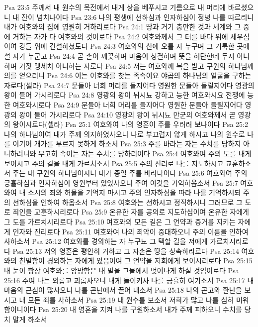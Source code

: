 Psa 23:5  주께서 내 원수의 목전에서 내게 상을 베푸시고 기름으로 내 머리에 바르셨으니 내 잔이 넘치나이다
Psa 23:6  나의 평생에 선하심과 인자하심이 정녕 나를 따르리니 내가 여호와의 집에 영원히 거하리로다
Psa 24:1  땅과 거기 충만한 것과 세계와 그 중에 거하는 자가 다 여호와의 것이로다
Psa 24:2  여호와께서 그 터를 바다 위에 세우심이여 강들 위에 건설하셨도다
Psa 24:3  여호와의 산에 오를 자 누구며 그 거룩한 곳에 설 자가 누군고
Psa 24:4  곧 손이 깨끗하며 마음이 청결하며 뜻을 허탄한데 두지 아니하며 거짓 맹세치 아니하는 자로다
Psa 24:5  저는 여호와께 복을 받고 구원의 하나님께 의를 얻으리니
Psa 24:6  이는 어호와를 찾는 족속이요 야곱의 하나님의 얼굴을 구하는 자로다(셀라)
Psa 24:7  문들아 너희 머리를 들지어다 영원한 문들아 들릴지어다 영광의 왕이 들어 가시리로다
Psa 24:8  영광의 왕이 뉘시뇨 강하고 능한 여호와시요 전쟁에 능한 여호와시로다
Psa 24:9  문들아 너희 머리를 들지어다 영원한 문들아 들릴지어다 영광의 왕이 들어 가시리로다
Psa 24:10  영광의 왕이 뉘시뇨 만군의 여호와께서 곧 영광의 왕이시로다(셀라)
Psa 25:1  여호와여 나의 영혼이 주를 우러러 보나이다
Psa 25:2  나의 하나님이여 내가 주께 의지하였사오니 나로 부끄럽지 않게 하시고 나의 원수로 나를 이기어 개가를 부르지 못하게 하소서
Psa 25:3  주를 바라는 자는 수치를 당하지 아니하려니와 무고히 속이는 자는 수치를 당하리이다
Psa 25:4  여호와여 주의 도를 내게 보이시고 주의 길을 내게 가르치소서
Psa 25:5  주의 진리로 나를 지도하시고 교훈하소서 주는 내 구원의 하나님이시니 내가 종일 주를 바라나이다
Psa 25:6  여호와여 주의 긍휼하심과 인자하심이 영원부터 있었사오니 주여 이것을 기억하옵소서
Psa 25:7  여호와여 내 소시의 죄와 허물을 기억지 마시고 주의 인자하심을 따라 나를 기억하시되 주의 선하심을 인하여 하옵소서
Psa 25:8  여호와는 선하시고 정직하시니 그러므로 그 도로 죄인을 교훈하시리로다
Psa 25:9  온유한 자를 공의로 지도하심이여 온유한 자에게 그 도를 가르치시리로다
Psa 25:10  여호와의 모든 길은 그 언약과 증거를 지키는 자에게 인자와 진리로다
Psa 25:11  여호와여 나의 죄악이 중대하오니 주의 이름을 인하여 사하소서
Psa 25:12  여호와를 경외하는 자 누구뇨 그 택할 길을 저에게 가르치시리로다
Psa 25:13  저의 영혼은 평안히 거하고 그 자손은 땅을 상속하리로다
Psa 25:14  여호와의 친밀함이 경외하는 자에게 있음이여 그 언약을 저희에게 보이시리로다
Psa 25:15  내 눈이 항상 여호와를 앙망함은 내 발을 그물에서 벗어나게 하실 것임이로다
Psa 25:16  주여 나는 외롭고 괴롭사오니 내게 돌이키사 나를 긍휼히 여기소서
Psa 25:17  내 마음의 근심이 많사오니 나를 곤난에서 끌어 내소서
Psa 25:18  나의 곤고와 환난을 보시고 내 모든 죄를 사하소서
Psa 25:19  내 원수를 보소서 저희가 많고 나를 심히 미워함이니이다
Psa 25:20  내 영혼을 지켜 나를 구원하소서 내가 주께 피하오니 수치를 당치 말게 하소서

